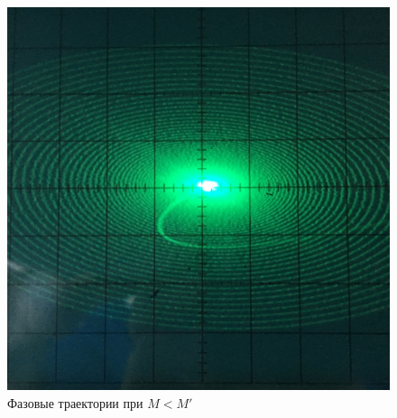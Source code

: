 \begin{figure}[h!]
\begin{minipage}{0.32\linewidth}
	\end{minipage}
	\begin{minipage}{0.32\linewidth}
	\includegraphics[width=\linewidth]{photo/task3b(leftL).jpg}
	\end{minipage}
	\caption{Фазовые траектории при $M<M'$}
	\label{fig13}
\end{figure}
\vspace{-20pt}
